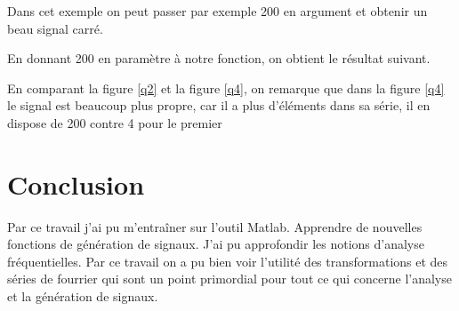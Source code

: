 Dans cet exemple on peut passer par exemple 200 en argument et obtenir un beau signal carré.


En donnant 200 en paramètre à notre fonction, on obtient le résultat suivant.

En comparant la figure \ref{q2} et la figure \ref{q4}, on remarque que dans la figure \ref{q4} le signal est beaucoup plus propre, car il a plus d'éléments dans sa série, il en dispose de 200 contre 4 pour le premier 


\section{Conclusion}
Par ce travail j'ai pu m'entraîner sur l'outil Matlab. Apprendre de nouvelles fonctions de génération de signaux. J'ai pu approfondir les notions d'analyse fréquentielles. Par ce travail on a pu bien voir l'utilité des transformations et des séries de fourrier qui sont un point primordial pour tout ce qui concerne l'analyse et la génération de signaux.

